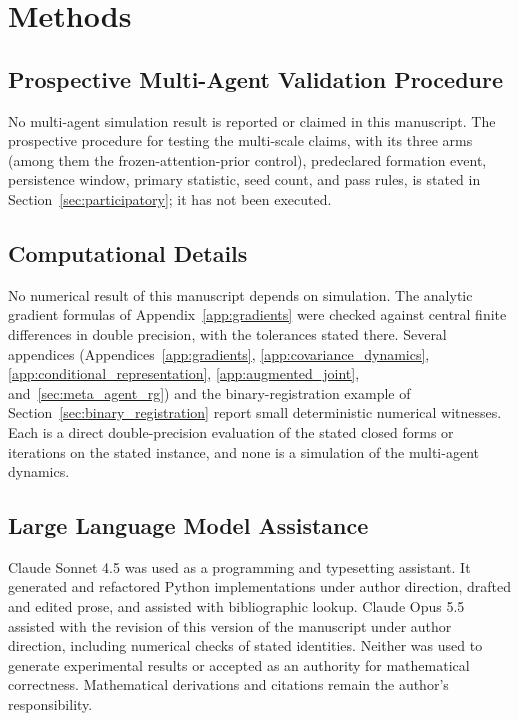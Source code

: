 \section{Methods}\label{sec:methods}

\subsection{Prospective Multi-Agent Validation Procedure}
\label{sec:methods_metagent}

No multi-agent simulation result is reported or claimed in this manuscript. The prospective procedure for testing the multi-scale claims, with its three arms (among them the frozen-attention-prior control), predeclared formation event, persistence window, primary statistic, seed count, and pass rules, is stated in Section~\ref{sec:participatory}; it has not been executed.

\subsection{Computational Details}

No numerical result of this manuscript depends on simulation. The analytic gradient formulas of Appendix~\ref{app:gradients} were checked against central finite differences in double precision, with the tolerances stated there. Several appendices (Appendices~\ref{app:gradients}, \ref{app:covariance_dynamics}, \ref{app:conditional_representation}, \ref{app:augmented_joint}, and~\ref{sec:meta_agent_rg}) and the binary-registration example of Section~\ref{sec:binary_registration} report small deterministic numerical witnesses. Each is a direct double-precision evaluation of the stated closed forms or iterations on the stated instance, and none is a simulation of the multi-agent dynamics.

\subsection{Large Language Model Assistance}

Claude Sonnet 4.5 was used as a programming and typesetting assistant. It generated and refactored Python implementations under author direction, drafted and edited prose, and assisted with bibliographic lookup. Claude Opus 5.5 assisted with the revision of this version of the manuscript under author direction, including numerical checks of stated identities. Neither was used to generate experimental results or accepted as an authority for mathematical correctness. Mathematical derivations and citations remain the author's responsibility.

